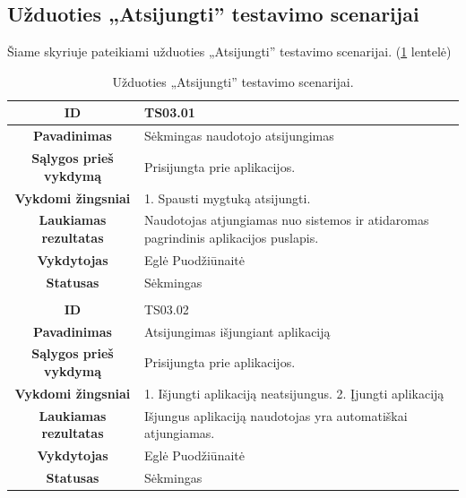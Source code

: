 \documentclass{VUMIFPSkursinis}
\begin{document}
	\subsection{Užduoties „Atsijungti” testavimo scenarijai}
Šiame skyriuje pateikiami užduoties „Atsijungti” testavimo scenarijai. (\ref{atsijungimas} lentelė)
\begin{table}[H]
	\caption{Užduoties „Atsijungti” testavimo scenarijai.}
	\begin{tabular}{|p{6cm}|p{11cm}|}
		\hline
		\multicolumn{1}{|c|}{{\bfseries ID}}&
		{TS03.01}\\
		\hline
		\multicolumn{1}{|c|}{{\bfseries Pavadinimas}}&
		{Sėkmingas naudotojo atsijungimas}\\
		\hline
		\multicolumn{1}{|c|}{{\bfseries Sąlygos prieš vykdymą}}&
		{Prisijungta prie aplikacijos.}\\
		\hline
		\multicolumn{1}{|c|}{{\bfseries Vykdomi žingsniai}}&
		{1. Spausti mygtuką atsijungti.}\\
		\hline
		\multicolumn{1}{|c|}{{\bfseries Laukiamas rezultatas}}&
		{Naudotojas atjungiamas nuo sistemos ir atidaromas pagrindinis aplikacijos puslapis.}\\
		\hline
		\multicolumn{1}{|c|}{{\bfseries Vykdytojas}}&
		{Eglė Puodžiūnaitė}\\
		\hline
		\multicolumn{1}{|c|}{{\bfseries Statusas}}&
		{Sėkmingas}\\
		\hline
		\rowcolor{lightgray}
		\multicolumn{2}{|c|}{}\\
		\hline
		\multicolumn{1}{|c|}{{\bfseries ID}}&
		{TS03.02}\\
		\hline
		\multicolumn{1}{|c|}{{\bfseries Pavadinimas}}&
		{Atsijungimas išjungiant aplikaciją}\\
		\hline
		\multicolumn{1}{|c|}{{\bfseries Sąlygos prieš vykdymą}}&
		{Prisijungta prie aplikacijos.}\\
		\hline
		\multicolumn{1}{|c|}{{\bfseries Vykdomi žingsniai}}&
		{1. Išjungti aplikaciją neatsijungus. 2. Įjungti aplikaciją}\\
		\hline
		\multicolumn{1}{|c|}{{\bfseries Laukiamas rezultatas}}&
		{Išjungus aplikaciją naudotojas yra automatiškai atjungiamas.}\\
		\hline
		\multicolumn{1}{|c|}{{\bfseries Vykdytojas}}&
		{Eglė Puodžiūnaitė}\\
		\hline
		\multicolumn{1}{|c|}{{\bfseries Statusas}}&
		{Sėkmingas}\\
		\hline
	\end{tabular}
	\label{atsijungimas}
\end{table}	
\end{document}
